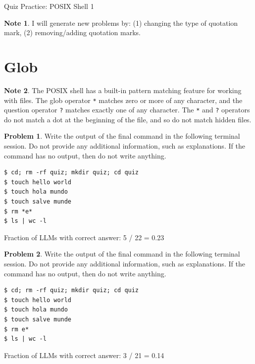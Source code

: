 \documentclass[10pt]{article}
\theoremstyle{definition}
\newtheorem{problem}{Problem}
\newtheorem{note}{Note}
\begin{document}
\begin{center}
{
\Large
Quiz Practice: POSIX Shell 1
}
\vspace{0.1in}
\end{center}

\begin{note}
    I will generate new problems by:
    (1) changing the type of quotation mark,
    (2) removing/adding quotation marks.
\end{note}

\noindent\vspace{0.1in}\begin{minipage}{\textwidth}
\section{Glob}

\begin{note}
The POSIX shell has a built-in pattern matching feature for working with files.
The glob operator \lstinline{*} matches zero or more of any character,
and the question operator \lstinline{?} matches exactly one of any character.
The \lstinline{*} and \lstinline{?} operators do not match a dot at the beginning of the file, and so do not match hidden files.


\end{note}

\end{minipage}
\noindent\vspace{0.1in}\begin{minipage}{\textwidth}

\begin{problem}
Write the output of the final command in the following terminal session.
Do not provide any additional information,
such as explanations.
If the command has no output,
then do not write anything.

\end{problem}
\begin{lstlisting}
$ cd; rm -rf quiz; mkdir quiz; cd quiz
$ touch hello world
$ touch hola mundo 
$ touch salve munde
$ rm *e*
$ ls | wc -l
\end{lstlisting}

Fraction of LLMs with correct answer: 5 / 22 = 0.23
\end{minipage}
\noindent\vspace{0.1in}\begin{minipage}{\textwidth}

\begin{problem}
Write the output of the final command in the following terminal session.
Do not provide any additional information,
such as explanations.
If the command has no output,
then do not write anything.

\end{problem}
\begin{lstlisting}
$ cd; rm -rf quiz; mkdir quiz; cd quiz
$ touch hello world
$ touch hola mundo 
$ touch salve munde
$ rm e*
$ ls | wc -l
\end{lstlisting}

Fraction of LLMs with correct answer: 3 / 21 = 0.14
\end{minipage}
\end{document}
